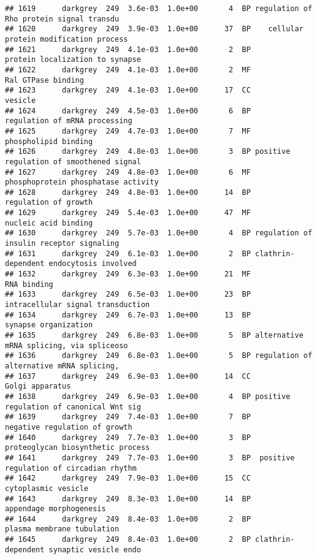 \documentclass[]{article}
\begin{document}
\begin{verbatim}
## 1619      darkgrey  249  3.6e-03  1.0e+00       4  BP regulation of Rho protein signal transdu
## 1620      darkgrey  249  3.9e-03  1.0e+00      37  BP    cellular protein modification process
## 1621      darkgrey  249  4.1e-03  1.0e+00       2  BP          protein localization to synapse
## 1622      darkgrey  249  4.1e-03  1.0e+00       2  MF                       Ral GTPase binding
## 1623      darkgrey  249  4.1e-03  1.0e+00      17  CC                                  vesicle
## 1624      darkgrey  249  4.5e-03  1.0e+00       6  BP            regulation of mRNA processing
## 1625      darkgrey  249  4.7e-03  1.0e+00       7  MF                     phospholipid binding
## 1626      darkgrey  249  4.8e-03  1.0e+00       3  BP positive regulation of smoothened signal
## 1627      darkgrey  249  4.8e-03  1.0e+00       6  MF      phosphoprotein phosphatase activity
## 1628      darkgrey  249  4.8e-03  1.0e+00      14  BP                     regulation of growth
## 1629      darkgrey  249  5.4e-03  1.0e+00      47  MF                     nucleic acid binding
## 1630      darkgrey  249  5.7e-03  1.0e+00       4  BP regulation of insulin receptor signaling
## 1631      darkgrey  249  6.1e-03  1.0e+00       2  BP clathrin-dependent endocytosis involved 
## 1632      darkgrey  249  6.3e-03  1.0e+00      21  MF                              RNA binding
## 1633      darkgrey  249  6.5e-03  1.0e+00      23  BP        intracellular signal transduction
## 1634      darkgrey  249  6.7e-03  1.0e+00      13  BP                     synapse organization
## 1635      darkgrey  249  6.8e-03  1.0e+00       5  BP alternative mRNA splicing, via spliceoso
## 1636      darkgrey  249  6.8e-03  1.0e+00       5  BP regulation of alternative mRNA splicing,
## 1637      darkgrey  249  6.9e-03  1.0e+00      14  CC                          Golgi apparatus
## 1638      darkgrey  249  6.9e-03  1.0e+00       4  BP positive regulation of canonical Wnt sig
## 1639      darkgrey  249  7.4e-03  1.0e+00       7  BP            negative regulation of growth
## 1640      darkgrey  249  7.7e-03  1.0e+00       3  BP        proteoglycan biosynthetic process
## 1641      darkgrey  249  7.7e-03  1.0e+00       3  BP  positive regulation of circadian rhythm
## 1642      darkgrey  249  7.9e-03  1.0e+00      15  CC                      cytoplasmic vesicle
## 1643      darkgrey  249  8.3e-03  1.0e+00      14  BP                  appendage morphogenesis
## 1644      darkgrey  249  8.4e-03  1.0e+00       2  BP               plasma membrane tubulation
## 1645      darkgrey  249  8.4e-03  1.0e+00       2  BP clathrin-dependent synaptic vesicle endo

\end{verbatim}
\end{document}
